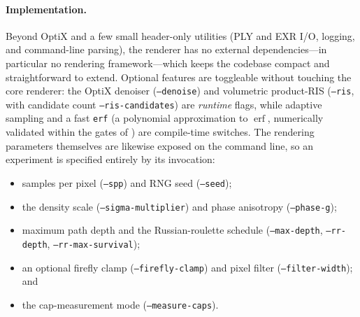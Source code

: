 \paragraph{Implementation.} Beyond OptiX and a few small header-only utilities (PLY and EXR I/O,
logging, and command-line parsing), the renderer has no external dependencies---in particular no
rendering framework---which keeps the codebase compact and straightforward to extend. Optional
features are toggleable without touching the core renderer: the OptiX denoiser (\texttt{--denoise}) and
volumetric product-RIS (\texttt{--ris}, with candidate count \texttt{--ris-candidates}) are
\emph{runtime} flags, while adaptive sampling and a fast \texttt{erf} (a polynomial approximation to $\operatorname{erf}$,
numerically validated within the gates of ) are compile-time
switches. The rendering parameters themselves are likewise exposed on the command line, so an experiment is
specified entirely by its invocation:
\begin{itemize}\sloppy
  \item samples per pixel (\texttt{--spp}) and RNG seed (\texttt{--seed});
  \item the density scale (\texttt{--sigma-multiplier}) and phase anisotropy (\texttt{--phase-g});
  \item maximum path depth and the Russian-roulette schedule (\texttt{--max-depth},
  \texttt{--rr-depth}, \texttt{--rr-max-survival});
  \item an optional firefly clamp (\texttt{--firefly-clamp}) and pixel filter
  (\texttt{--filter-width}); and
  \item the cap-measurement mode (\texttt{--measure-caps}).
\end{itemize}
